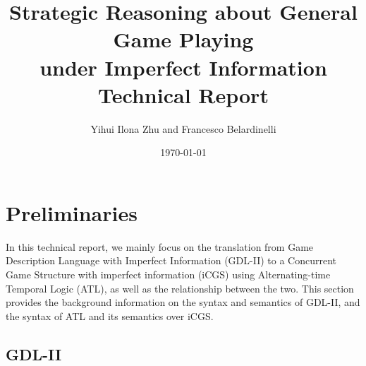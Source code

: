 \documentclass{article}
\theoremstyle{theorem}
\theoremstyle{lemma}
\theoremstyle{definition}
\theoremstyle{remark}
\begin{document}
\title{Strategic Reasoning about General Game Playing\\ under Imperfect Information\\ \large Technical Report}
\author{Yihui Ilona Zhu and Francesco Belardinelli}
\date{\today}

\maketitle

\section{Preliminaries}
\par In this technical report, we mainly focus on the translation from
Game Description Language with Imperfect Information (GDL-II) to a
Concurrent Game Structure with imperfect information (iCGS) using
Alternating-time Temporal Logic (ATL), as well as the relationship
between the two. This section provides the background information on
the syntax and semantics of GDL-II, and the syntax of ATL and its
semantics over iCGS.


\subsection{GDL-II}
\end{document}
